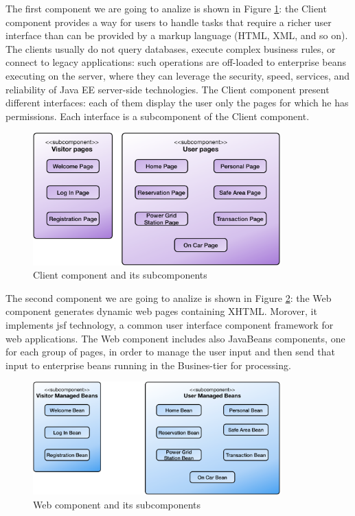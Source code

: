 \newline
The first component we are going to analize is shown in Figure \ref{fig:client}: the Client component provides a way for users to handle tasks that require a richer user interface than can be provided by a markup language (HTML, XML, and so on).
The clients usually do not query databases, execute complex business rules, or connect to legacy applications: such operations are off-loaded to enterprise beans executing on the server, where they can leverage the security, speed, services, and reliability of Java EE server-side technologies.
The Client component present different interfaces: each of them display the user only the pages for which he has permissions. 
Each interface is a subcomponent of the Client component.

\vspace{52pt}
\begin{figure}[htbp]
\centering
\includegraphics[width=0.85\textwidth]{Images/ClientComponent.pdf}
\vspace{10pt}
\caption{Client component and its subcomponents}
\label{fig:client}
\end{figure}
\clearpage

\newline
The second component we are going to analize is shown in Figure \ref{fig:web}: the Web component generates dynamic web pages containing XHTML. Morover, it implements \acl{jsf} technology, a common user interface component framework for web applications.
The Web component includes also JavaBeans components, one for each group of pages, in order to manage the user input and then send that input to enterprise beans running in the Busines-tier for processing.

\vspace{104pt}
\begin{figure}[htbp]
\centering
\includegraphics[width=0.85\textwidth]{Images/WebComponent.pdf}
\vspace{10pt}
\caption{Web component and its subcomponents}
\label{fig:web}
\end{figure}
\clearpage

